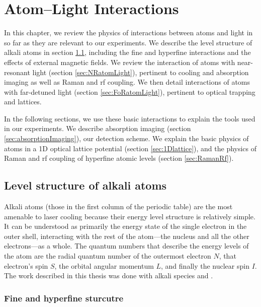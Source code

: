 \renewcommand{\thechapter}{2}

\chapter{Atom--Light Interactions}
In this chapter, we review the physics of interactions between atoms and light in so far as they are relevant to our experiments. We describe the level structure of alkali atoms in section \ref{sec:atomicStructure}, including the fine and hyperfine interactions and the effects of external magnetic fields. We review the interaction of atoms with near-resonant light (section \ref{sec:NRatomLight}), pertinent to cooling and absorption imaging as well as Raman and rf coupling. We then detail interactions of atoms with far-detuned light (section \ref{sec:FoRatomLight}), pertinent to optical trapping and lattices. 

In the following sections, we use these basic interactions to explain the tools used in our experiments. We describe absorption imaging (section \ref{sec:absorptionImaging}), our detection scheme. We explain the basic physics of atoms in a 1D optical lattice potential (section \ref{sec:1Dlattice}), and the physics of Raman and rf coupling of hyperfine atomic levels (section \ref{sec:RamanRf}). 


\section{Level structure of alkali atoms}\label{sec:atomicStructure}

Alkali atoms (those in the first column of the periodic table) are the most amenable to laser cooling because their energy level structure is relatively simple. It can be understood as primarily the energy state of the single electron in the outer shell, interacting with the rest of the atom---the nucleus and all the other electrons---as a whole. The quantum numbers that describe the energy levels of the atom are the radial quantum number of the outermost electron $N$, that electron's spin $S$, the orbital angular momentum $L$, and finally the nuclear spin $I$. The work described in this thesis was done with alkali species \Rb{} and \K{}.

\subsection{Fine and hyperfine sturcutre}\label{sec:hyperfine}

